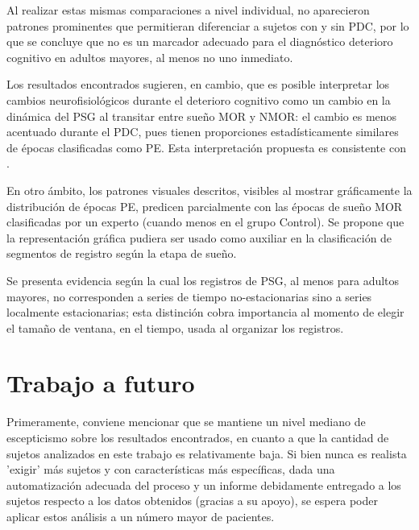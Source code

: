 \documentclass[12pt,a4paper]{mitthesis}
\begin{document}
Al realizar estas mismas comparaciones a nivel individual, no aparecieron patrones prominentes que 
permitieran diferenciar a sujetos con y sin PDC, por lo que se concluye que no es un marcador 
adecuado para el diagn\'ostico deterioro cognitivo en adultos mayores, al menos no uno inmediato.

Los resultados encontrados sugieren, en cambio, que es posible interpretar los cambios 
neurofisiol\'ogicos durante el deterioro cognitivo como un cambio en la din\'amica del PSG al 
transitar entre sue\~no MOR y NMOR: el cambio es menos acentuado durante el PDC, pues tienen 
proporciones estad\'isticamente similares de \'epocas clasificadas como PE.
Esta interpretaci\'on propuesta es consistente con \cite{Valeria}.

En otro \'ambito, los patrones visuales descritos, visibles al mostrar gr\'aficamente la 
distribuci\'on de \'epocas PE, predicen parcialmente con las \'epocas de sue\~no MOR clasificadas 
por un experto (cuando menos en el grupo Control).
Se propone que la representaci\'on gr\'afica pudiera ser usado como auxiliar en la clasificaci\'on 
de segmentos de registro seg\'un la etapa de sue\~no.

Se presenta evidencia seg\'un la cual los registros de PSG, al menos para adultos mayores, no 
corresponden a series de tiempo no-estacionarias sino a series localmente estacionarias; esta 
distinci\'on cobra importancia al momento de elegir el tama\~no de ventana, en el tiempo, usada al 
organizar los registros.


\section{Trabajo a futuro}

Primeramente, conviene mencionar que se mantiene un nivel mediano de escepticismo sobre los 
resultados encontrados, en cuanto a que la cantidad de sujetos analizados en este trabajo es 
relativamente baja. Si bien nunca es realista 'exigir' m\'as sujetos y con caracter\'isticas m\'as 
espec\'ificas, dada una automatizaci\'on adecuada del proceso y un informe debidamente entregado a 
los sujetos respecto a los datos obtenidos (gracias a su apoyo), se espera poder aplicar estos 
an\'alisis a un n\'umero mayor de pacientes.
\end{document}
